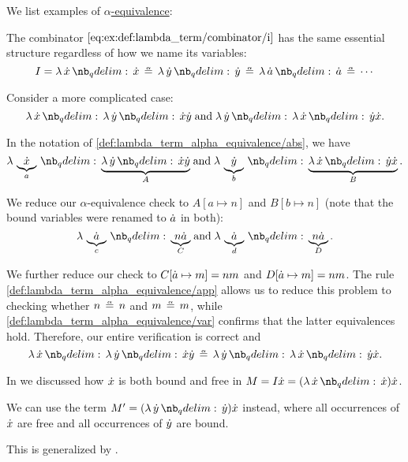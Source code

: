 \begin{example}\label{ex:def:lambda_term_alpha_equivalence}
  We list examples of \hyperref[def:lambda_term_alpha_equivalence]{\( \alpha \)-equivalence}:
  \begin{thmenum}
     The combinator \( \ref{eq:ex:def:lambda_term/combinator/i} \) has the same essential structure regardless of how we name its variables:
    \begin{equation*}
      I = \qabs \synx \synx \aequiv \qabs \syny \syny \aequiv \qabs \syna \syna \aequiv \cdots
    \end{equation*}

     Consider a more complicated case:
    \begin{equation*}
      \qabs \synx \qabs \syny \synx \syny
      \T{and}
      \qabs \syny \qabs \synx \syny \synx.
    \end{equation*}

    In the notation of \ref{def:lambda_term_alpha_equivalence/abs}, we have
    \begin{equation*}
      \qabs {\underbrace{\synx}_a} \underbrace{\qabs \syny \synx \syny}_A
      \T{and}
      \qabs {\underbrace{\syny}_b} \underbrace{\qabs \synx \syny \synx}_B.
    \end{equation*}

    We reduce our \( \alpha \)-equivalence check to \( A[a \mapsto n] \) and \( B[b \mapsto n] \) (note that the bound variables were renamed to \( {\dot{a}} \) in both):
    \begin{equation*}
      \qabs {\underbrace{\syna}_c} \underbrace{n \syna}_C
      \T{and}
      \qabs {\underbrace{\syna}_d} \underbrace{n \syna}_D.
    \end{equation*}

    We further reduce our check to \( C[{\dot{a}} \mapsto m] = nm \) and \( D[{\dot{a}} \mapsto m] = nm \). The rule \ref{def:lambda_term_alpha_equivalence/app} allows us to reduce this problem to checking whether \( n \aequiv n \) and \( m \aequiv m \), while \ref{def:lambda_term_alpha_equivalence/var} confirms that the latter equivalences hold. Therefore, our entire verification is correct and
    \begin{equation*}
      \qabs \synx \qabs \syny \synx \syny \aequiv \qabs \syny \qabs \synx \syny \synx.
    \end{equation*}

     In  we discussed how \( {\dot{x}} \) is both bound and free in \( M = I \synx = (\qabs \synx \synx) \synx \).

    We can use the term \( M' = (\qabs \syny \syny) \synx \) instead, where all occurrences of \( {\dot{x}} \) are free and all occurrences of \( {\dot{y}} \) are bound.

    This is generalized by .
  \end{thmenum}
\end{example}

